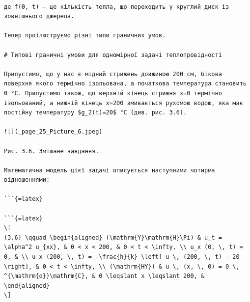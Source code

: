 \documentclass[
  ukrainian,
]{article}
\begin{document}
\begin{verbatim}

де f(0, t) — це кількість тепла, що переходить у круглий диск із зовнішнього джерела.

Тепер проілюструємо різні типи граничних умов.

# Типові граничні умови для одномірної задачі теплопровідності

Припустимо, що у нас є мідний стрижень довжиною 200 см, бікова поверхня якого термічно ізольована, а початкова температура становить 0 °C. Припустимо також, що верхній кінець стрижня x=0 термічно ізольований, а нижній кінець x=200 змивається рухомою водою, яка має постійну температуру $g_2(t)=20$ °C (див. рис. 3.6).

![](_page_25_Picture_6.jpeg)

Рис. 3.6. Змішане завдання.

Математична модель цієї задачі описується наступними чотирма відношеннями:

```{=latex}

```{=latex}
\[
(3.6) \qquad \begin{aligned} (\mathrm{Y}\mathrm{H}\Pi) & u_t = \alpha^2 u_{xx}, & 0 < x < 200, & 0 < t < \infty, \\ u_x (0, \, t) = 0, & \\ u_x (200, \, t) = -\frac{h}{k} \left[ u \, (200, \, t) - 20 \right], & 0 < t < \infty, \\ (\mathrm{HY}) & u \, (x, \, 0) = 0 \, ^{\mathrm{o}}\mathrm{C}, & 0 \leqslant x \leqslant 200, & \end{aligned}
\]
\end{verbatim}
\end{document}
